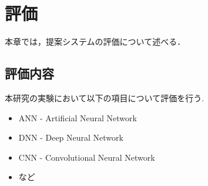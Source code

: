 \chapter{評価}
\label{evaluation}

本章では，提案システムの評価について述べる．


\section{評価内容}

本研究の実験において以下の項目について評価を行う.


\begin{itemize}
    \item ANN - Artificial Neural Network
    \item DNN - Deep Neural Network
    \item CNN - Convolutional Neural Network
    \item など
\end{itemize}


